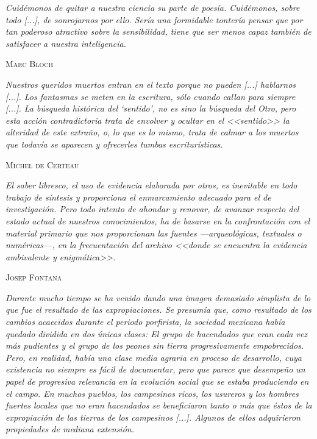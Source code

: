 \documentclass[14pt,twoside,final]{extbook} %
\begin{document}
\begin{flushright}
\footnotesize
\begin{minipage}{8cm}
\emph{Cuidémonos de quitar a nuestra ciencia su parte de poesía. Cuidémonos, sobre todo [...], de sonrojarnos por ello. Sería una formidable tontería pensar que por tan poderoso atractivo sobre la sensibilidad, tiene que ser menos capaz también de satisfacer a nuestra inteligencia.}
\begin{flushright}
\textsc{Marc Bloch}
\end{flushright}
\begin{flushright}
\begin{minipage}{8cm}
\emph{Nuestros queridos muertos entran en el texto porque no pueden [...] hablarnos [...]. Los fantasmas se meten en la escritura, sólo cuando callan para siempre [...]. La búsqueda histórica del `sentido', no es sino la búsqueda del Otro, pero esta acción contradictoria trata de envolver y ocultar en el <<sentido>> la alteridad de este extraño, o, lo que es lo mismo, trata de calmar a los muertos que todavía se aparecen y ofrecerles tumbas escriturísticas.}
\end{minipage}
\end{flushright}
\begin{flushright}
\textsc{Michel de Certeau}
\end{flushright}
\begin{flushright}
\begin{minipage}{8cm}
\emph{El saber libresco, el uso de evidencia elaborada por otros, es inevitable en todo trabajo de síntesis y proporciona el enmarcamiento adecuado para el de investigación. Pero todo intento de ahondar y renovar, de avanzar respecto del estado actual de nuestros conocimientos, ha de basarse en la confrontación con el material primario que nos proporcionan las fuentes ---arqueológicas, textuales o numéricas---, en la frecuentación del archivo <<donde se encuentra la evidencia ambivalente y enigmática>>.}
\end{minipage}
\end{flushright}
\begin{flushright}
\textsc{Josep Fontana}
\end{flushright}
\begin{flushright}
\begin{minipage}{8cm}
\emph{Durante mucho tiempo se ha venido dando una imagen demasiado simplista de lo que fue el resultado de las expropiaciones. Se presumía que, como resultado de los cambios acaecidos durante el
periodo porfirista, la sociedad mexicana había quedado dividida en dos únicas clases: El grupo de hacendados que eran cada vez más pudientes y el grupo de los peones sin tierra progresivamente empobrecidos. Pero, en realidad, había una clase media agraria en proceso de desarrollo, cuya existencia no siempre es fácil de documentar, pero que parece que desempeño un papel de progresiva relevancia en la evolución social que se estaba produciendo en el campo. En muchos pueblos, los campesinos ricos, los usureros y los hombres fuertes locales que no eran hacendados se beneficiaron tanto o más que éstos de la expropiación de las tierras de los campesinos [...]. Algunos de ellos adquirieron propiedades de mediana extensión.}

\end{minipage}
\end{flushright}
\end{minipage}
\end{flushright}
\end{document}
